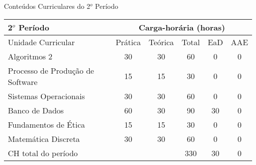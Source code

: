 \begin{quadro}[ht!]
\centering
\caption{Conteúdos Curriculares do 2$^o$ Período}\label{qua:periodo2}
\begin{tabular}{|p{8.0cm}|c|c|c|c|c|}
\hline
\rowcolor{blue1} 2$^o$ Período & \multicolumn{5}{|c|}{\centering Carga-horária (horas)} \\ \hline
\rowcolor{blue1} Unidade Curricular & Prática & Teórica & Total & EaD & AAE \\ \hline
Algoritmos 2 & 30 & 30 & 60 & 0	&	0 \\	\hline
Processo de Produção de Software & 15 & 15 & 30 & 0	&	0 \\	\hline
Sistemas Operacionais & 30 & 30 & 60 & 0	&	0 \\	\hline
Banco de Dados & 60 & 30 & 90 & 30	&	0 \\	\hline
Fundamentos de Ética & 15 & 15 & 30 & 0	&	0 \\	\hline
Matemática Discreta & 30 & 30 & 60 & 0	&	0 \\	\hline
CH total do período & \multicolumn{2}{p{3.3cm}|}{\cellcolor{blue1}} & 330 & 30	&	0 \\ \hline
\end{tabular} \end{quadro}